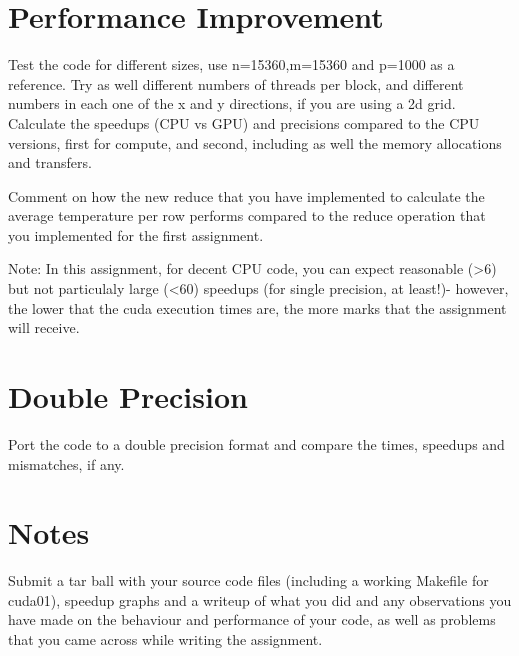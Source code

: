 \documentclass[a4paper, fleqn]{article}
\begin{document}
\section{Performance Improvement}%
\label{sec:performance_improvement}

Test the code for different sizes, use n=15360,m=15360 and p=1000 as a reference. Try as well different numbers of threads per block, and different numbers in each one of the x and y directions, if you are using a 2d grid. Calculate the speedups (CPU vs GPU) and precisions compared to the CPU versions, first for compute, and second, including as well the memory allocations and transfers.

Comment on how the new reduce that you have implemented to calculate the average temperature per row performs compared to the reduce operation that you implemented for the first assignment.

Note: In this assignment, for decent CPU code, you can expect reasonable (>6) but not particulaly large (<60) speedups (for single precision, at least!)- however, the lower that the cuda execution times are, the more marks that the assignment will receive.

\section{Double Precision}%
\label{sec:double_precision}


Port the code to a double precision format and compare the times, speedups and mismatches, if any.

\section*{Notes}%
\label{sec:notes}

Submit a tar ball with your source code files (including a working Makefile for cuda01), speedup graphs and a writeup of what you did and any observations you have made on the behaviour and performance of your code, as well as problems that you came across while writing the assignment.
\end{document}
